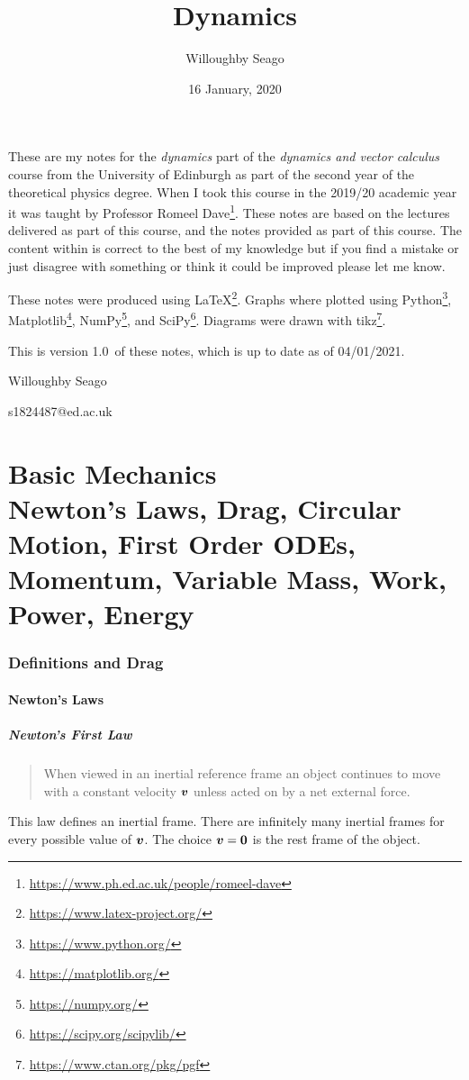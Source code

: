 \documentclass{article}
\author{Willoughby Seago}
\date{16 January, 2020}
\title{Dynamics}
\newcommand{\notesVersion}{1.0}
\newcommand{\notesDate}{04/01/2021}
\begin{document}
    \maketitle
    These are my notes for the \textit{dynamics} part of the \textit{dynamics and vector calculus} course from the University of Edinburgh as part of the second year of the theoretical physics degree.
    When I took this course in the 2019/20 academic year it was taught by Professor Romeel Dave\footnote{\url{https://www.ph.ed.ac.uk/people/romeel-dave}}.
    These notes are based on the lectures delivered as part of this course, and the notes provided as part of this course.
    The content within is correct to the best of my knowledge but if you find a mistake or just disagree with something or think it could be improved please let me know.
    
    These notes were produced using \LaTeX\footnote{\url{https://www.latex-project.org/}}.
    Graphs where plotted using Python\footnote{\url{https://www.python.org/}}, Matplotlib\footnote{\url{https://matplotlib.org/}}, NumPy\footnote{\url{https://numpy.org/}}, and SciPy\footnote{\url{https://scipy.org/scipylib/}}.
    Diagrams were drawn with tikz\footnote{\url{https://www.ctan.org/pkg/pgf}}.
    
    This is version \notesVersion~of these notes, which is up to date as of \notesDate.
    \begin{flushright}
        Willoughby Seago
        
        s1824487@ed.ac.uk
    \end{flushright}
    \clearpage
    \tableofcontents
    \listoffigures
    \listoftables
    \clearpage
    
    \part[Basic Mechanics]{Basic Mechanics\\[\bigskipamount]\large Newton's Laws, Drag, Circular Motion, First Order ODEs, Momentum, Variable Mass, Work, Power,  Energy}
    \section{Definitions and Drag}
    \subsection{Newton's Laws}
    \subsubsection{Newton's First Law}
    \begin{quote}
        When viewed in an inertial reference frame an object continues to move with a constant velocity \(\bm{v}\) unless acted on by a net external force.
    \end{quote}
    This law defines an inertial frame.
    There are infinitely many inertial frames for every possible value of \(\bm{v}\).
    The choice \(\bm{v} = \bm{0}\) is the rest frame of the object.
    
\end{document}
